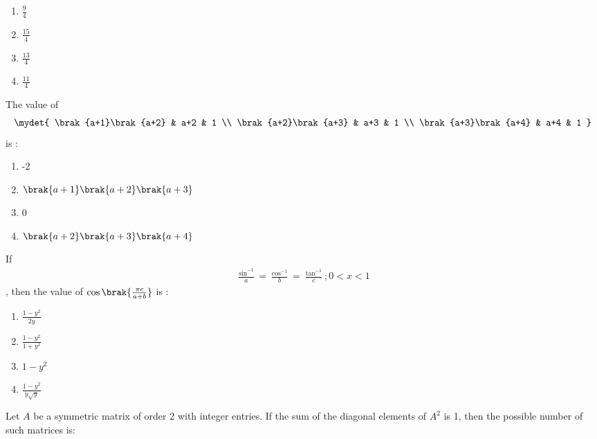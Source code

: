 		\hfill{}
	\begin{multicols}{4}
		\begin{enumerate}
			\item $\frac{9}{4}$ \columnbreak
			\item $\frac{15}{4}$ \columnbreak
			\item $\frac{13}{4}$ \columnbreak
			\item $\frac{11}{4}$
		\end{enumerate}
	\end{multicols}
\item The value of
		\begin{align}
			\mydet{
			\brak{a+1}\brak{a+2} & a+2 & 1 \\
			\brak{a+2}\brak{a+3} & a+3 & 1 \\
			\brak{a+3}\brak{a+4} & a+4 & 1
			}
		\end{align} is :
		\hfill{}
	
		\begin{enumerate}
			\item -2 
			\item $\brak{a+1}\brak{a+2}\brak{a+3}$ 
			\item 0 
			\item $\brak{a+2}\brak{a+3}\brak{a+4}$
		\end{enumerate}
\item If
		\begin{align}
			\frac{\sin ^{-1}}{a} = \frac{\cos ^{-1}}{b} = \frac{\tan ^{-1}}{c};
			0 < x < 1
		\end{align}, then the value of $\cos \brak{\frac{\pi c}{a+b}}$ is :
		\hfill{}
		
		\begin{enumerate}
			\item $\frac{1 - y^2}{2y}$ \\
			\item $\frac{1 - y^2}{1 + y^2}$\\
			\item $1 - y^2$ \\
			\item $\frac{1 - y^2}{y\sqrt{y}}$
		\end{enumerate}
\item Let $A$ be a symmetric matrix of order 2 with integer entries. If the sum of the diagonal
	elements of $A^2$ is 1, then the possible number of such matrices is:
		\hfill{}
		
